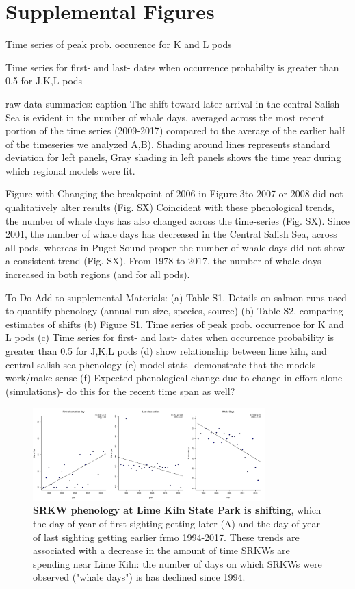 \documentclass{article}
\begin{document}
\section* {Supplemental Figures}
\par Time series of peak prob. occurence for K and L pods
\par Time series for first- and last- dates when occurrence probabilty is greater than 0.5 for J,K,L pods
\par raw data summaries: caption The shift toward later arrival in the central Salish Sea is evident in the number of whale days, averaged across the most recent portion of the time series (2009-2017) compared to the average of the earlier half of the timeseries we analyzed  A,B).  Shading around lines represents standard deviation for left panels, Gray shading in left panels shows the time year during which regional models were fit.


\par Figure with Changing the breakpoint of 2006 in Figure 3to 2007 or 2008 did not qualitatively alter results (Fig. SX)
Coincident with these phenological trends, the number of whale days has also changed across the time-series (Fig. SX). Since 2001, the number of whale days has decreased in the Central Salish Sea, across all pods, whereas in Puget Sound proper the number of whale days did not show a consistent trend (Fig. SX). From 1978 to 2017, the number of whale days increased in both regions (and for all pods). 
\par To Do 
Add to supplemental Materials: 
(a) Table S1. Details on salmon runs used to quantify phenology (annual run size, species, source)
(b) Table S2. comparing estimates of shifts 
(b) Figure S1. Time series of peak prob. occurrence for K and L pods 
(c) Time series for first- and last- dates when occurrence probability is greater than 0.5 for J,K,L pods 
(d) show relationship between lime kiln, and central salish sea phenology
(e) model stats- demonstrate that the models work/make sense 
(f) Expected phenological change due to change in effort alone (simulations)- do this for the recent time span as well?

\begin{figure}[p]
\includegraphics[width=0.8\textwidth]{../analyses/orcaphen/figures/limekilntrends_dat.pdf} 
\caption{\textbf{SRKW phenology at Lime Kiln State Park is shifting}, which the day of year of first sighting getting later (A) and the day of year of last sighting getting earlier frmo 1994-2017. These trends are associated with a decrease in the amount of time SRKWs are spending near Lime Kiln: the number of days on which SRKWs were observed ("whale days") is has declined since 1994. }
\label{fig:limetime}
\end{figure}
\end{document}
